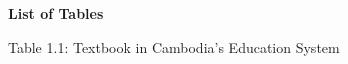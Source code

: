 \begin{adjustwidth}{0.2cm}{0.2cm}

    \begin{center}
        {\englishfont\fontsize{14pt}{21pt}\selectfont \textbf{List of Tables} \par}
    \end{center}
    \label{lot}

    \vspace{1cm}
    \setlength{\parindent}{0pt}
    \vspace{0.3cm}
    {\large Table 1.1: Textbook in Cambodia's Education System\dotfill\pageref{table:textbook}\hspace{0.1cm}\par}

\end{adjustwidth}